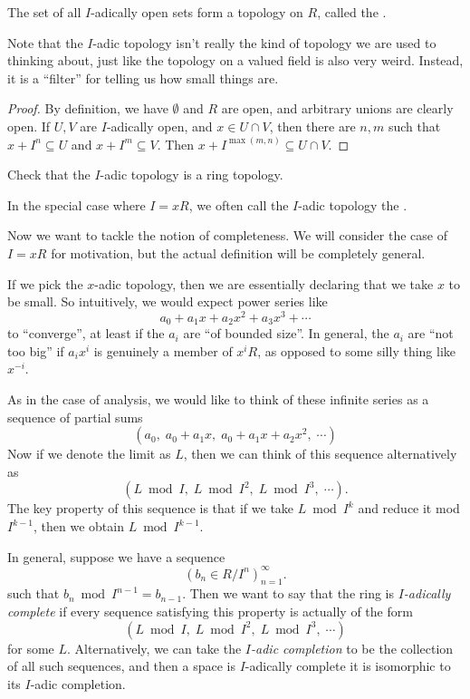 \documentclass[a4paper]{article}
\begin{document}
\begin{prop}
  The set of all $I$-adically open sets form a topology on $R$, called the .
\end{prop}
Note that the $I$-adic topology isn't really the kind of topology we are used to thinking about, just like the topology on a valued field is also very weird. Instead, it is a ``filter'' for telling us how small things are.

\begin{proof}
  By definition, we have $\emptyset$ and $R$ are open, and arbitrary unions are clearly open. If $U, V$ are $I$-adically open, and $x \in U \cap V$, then there are $n, m$ such that $x + I^n \subseteq U$ and $x + I^m \subseteq V$. Then $x + I^{\max(m, n)} \subseteq U \cap V$.
\end{proof}

\begin{ex}
  Check that the $I$-adic topology is a ring topology.
\end{ex}

In the special case where $I = xR$, we often call the $I$-adic topology the .

Now we want to tackle the notion of completeness. We will consider the case of $I = xR$ for motivation, but the actual definition will be completely general.

If we pick the $x$-adic topology, then we are essentially declaring that we take $x$ to be small. So intuitively, we would expect power series like
\[
  a_0 + a_1 x + a_2 x^2 + a_3 x^3 + \cdots
\]
to ``converge'', at least if the $a_i$ are ``of bounded size''. In general, the $a_i$ are ``not too big'' if $a_ix^i$ is genuinely a member of $x^i R$, as opposed to some silly thing like $x^{-i}$.

As in the case of analysis, we would like to think of these infinite series as a sequence of partial sums
\[
  (a_0,\; a_0 + a_1 x,\; a_0 + a_1 x + a_2 x^2,\; \cdots)
\]
Now if we denote the limit as $L$, then we can think of this sequence alternatively as
\[
  (L \bmod I,\; L \bmod I^2,\; L \bmod I^3,\; \cdots).
\]
The key property of this sequence is that if we take $L \bmod I^k$ and reduce it mod $I^{k - 1}$, then we obtain $L \bmod I^{k - 1}$.

In general, suppose we have a sequence
\[
  (b_n \in R/I^n)_{n = 1}^\infty.
\]
such that $b_n \bmod I^{n - 1} = b_{n - 1}$. Then we want to say that the ring is \emph{$I$-adically complete} if every sequence satisfying this property is actually of the form
\[
  (L \bmod I,\; L \bmod I^2,\; L \bmod I^3,\; \cdots)
\]
for some $L$. Alternatively, we can take the \emph{$I$-adic completion} to be the collection of all such sequences, and then a space is $I$-adically complete it is isomorphic to its $I$-adic completion.
\end{document}
